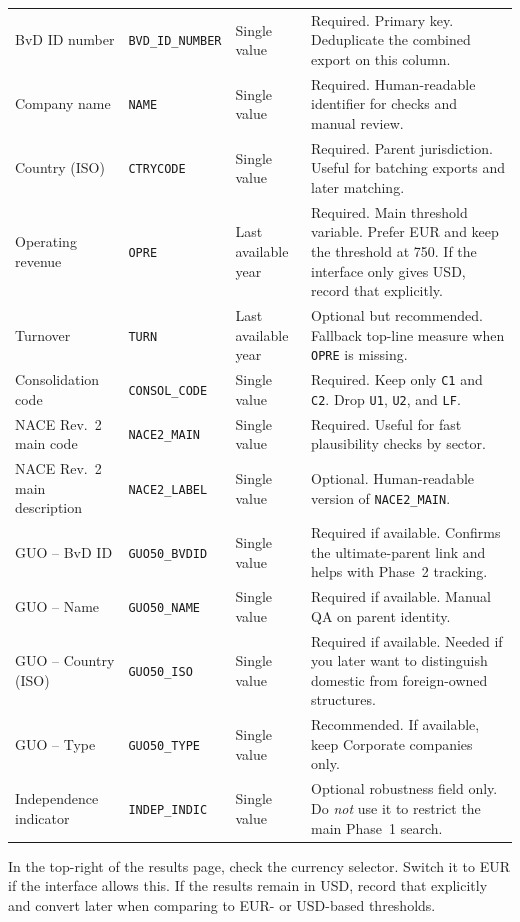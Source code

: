 \documentclass[11pt,a4paper]{article}
\newcommand{\field}[1]{\texttt{#1}}
\newcommand{\menu}[1]{\textsf{#1}}
\begin{document}
\begin{small}
\begin{longtable}{@{}L{3.3cm}L{2.8cm}L{2.2cm}L{5.9cm}@{}}
BvD ID number & \field{BVD\_ID\_NUMBER} & Single value & Required. Primary key. Deduplicate the combined export on this column. \\
Company name & \field{NAME} & Single value & Required. Human-readable identifier for checks and manual review. \\
Country (ISO) & \field{CTRYCODE} & Single value & Required. Parent jurisdiction. Useful for batching exports and later matching. \\
Operating revenue & \field{OPRE} & Last available year & Required. Main threshold variable. Prefer EUR and keep the threshold at 750. If the interface only gives USD, record that explicitly. \\
Turnover & \field{TURN} & Last available year & Optional but recommended. Fallback top-line measure when \field{OPRE} is missing. \\
Consolidation code & \field{CONSOL\_CODE} & Single value & Required. Keep only \field{C1} and \field{C2}. Drop \field{U1}, \field{U2}, and \field{LF}. \\
NACE Rev.~2 main code & \field{NACE2\_MAIN} & Single value & Required. Useful for fast plausibility checks by sector. \\
NACE Rev.~2 main description & \field{NACE2\_LABEL} & Single value & Optional. Human-readable version of \field{NACE2\_MAIN}. \\
GUO -- BvD ID & \field{GUO50\_BVDID} & Single value & Required if available. Confirms the ultimate-parent link and helps with Phase~2 tracking. \\
GUO -- Name & \field{GUO50\_NAME} & Single value & Required if available. Manual QA on parent identity. \\
GUO -- Country (ISO) & \field{GUO50\_ISO} & Single value & Required if available. Needed if you later want to distinguish domestic from foreign-owned structures. \\
GUO -- Type & \field{GUO50\_TYPE} & Single value & Recommended. If available, keep \menu{Corporate companies} only. \\
Independence indicator & \field{INDEP\_INDIC} & Single value & Optional robustness field only. Do \emph{not} use it to restrict the main Phase~1 search. \\
\end{longtable}
\end{small}

In the top-right of the results page, check the currency selector. Switch it to EUR if the interface allows this. If the results remain in USD, record that explicitly and convert later when comparing to EUR- or USD-based thresholds.
\end{document}
